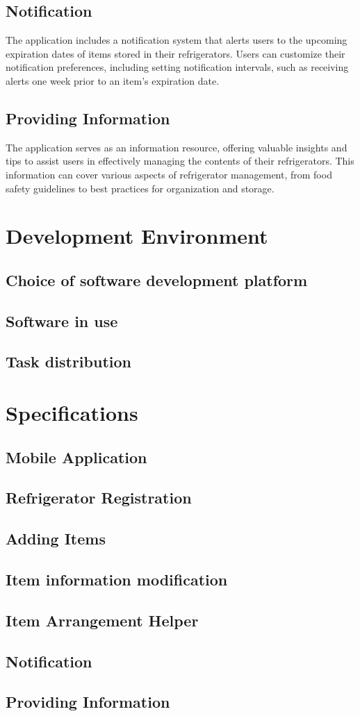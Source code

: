 \documentclass[conference]{IEEEtran}
\begin{document}
\subsection{Notification}
The application includes a notification system that alerts users to the upcoming expiration dates of items stored in their refrigerators. Users can customize their notification preferences, including setting notification intervals, such as receiving alerts one week prior to an item's expiration date.

\subsection{Providing Information}
The application serves as an information resource, offering valuable insights and tips to assist users in effectively managing the contents of their refrigerators. This information can cover various aspects of refrigerator management, from food safety guidelines to best practices for organization and storage.

\section{Development Environment}

\subsection{Choice of software development platform}
\subsection{Software in use}
\subsection{Task distribution}

\section{Specifications}

\subsection{Mobile Application}
\subsection{Refrigerator Registration}
\subsection{Adding Items}
\subsection{Item information modification}
\subsection{Item Arrangement Helper}
\subsection{Notification}
\subsection{Providing Information}
\end{document}
